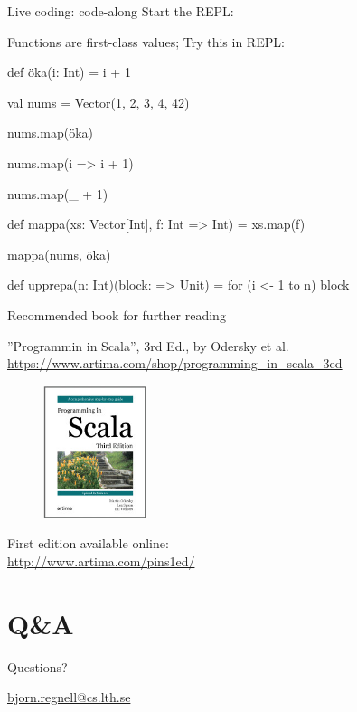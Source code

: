 \documentclass{lecturenotes}
\begin{document}
\begin{Slide}{Live coding: code-along}
Start the REPL:

\end{Slide}


\begin{Slide}{Functions are first-class values; Try this in REPL:}
\begin{REPL}[basicstyle=\color{white}\ttfamily\fontsize{8.5}{10}\selectfont]
def öka(i: Int) = i + 1

val nums = Vector(1, 2, 3, 4, 42)

nums.map(öka)

nums.map(i => i + 1)

nums.map(_ + 1)

def mappa(xs: Vector[Int], f: Int => Int) = xs.map(f)

mappa(nums, öka)

def upprepa(n: Int)(block: => Unit) = for (i <- 1 to n) block
\end{REPL}

\end{Slide}




\begin{Slide}{Recommended book for further reading}

\begin{center}
''Programmin in Scala'', 3rd Ed., by Odersky et al.\\
{\small\url{https://www.artima.com/shop/programming\_in\_scala\_3ed}}
\begin{figure}
\includegraphics[width=3cm]{img/pinsbook}
\end{figure}
First edition available online:\\ {\small\url{http://www.artima.com/pins1ed/}}
\end{center}
\end{Slide}

\section*{Q\&A}
\begin{Slide}{Questions?}
\begin{center}
\url{bjorn.regnell@cs.lth.se}
\end{center}
\end{Slide}
\end{document}
